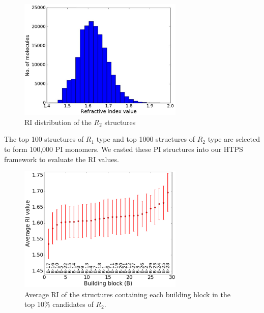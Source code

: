 \begin{figure}[htbp] 
	\centering
	\includegraphics[width=0.700\textwidth]{Chapter-5/Figures/RI_histogram.eps}
	\caption{RI distribution of the $R_2$ structures} 
	\label{fig:RI_hist} 
\end{figure}  

The top 100 structures of $R_1$ type and top 1000 structures of $R_2$ type are selected to form 100,000 PI monomers. We casted these PI structures into our HTPS framework to evaluate the RI values.

\begin{figure}[htbp] 
	\centering
	\includegraphics[width=0.700\textwidth]{Chapter-5/Figures/BB_avg_RI.eps}
	\caption{Average RI of the structures containing each building block in the top 10\% candidates of $R_2$. } 
	\label{fig:BB_avg_RI} 
\end{figure}  

